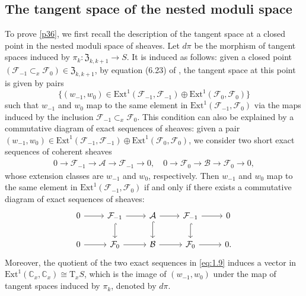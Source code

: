 \documentclass{amsart}
\numberwithin{equation}{section}
\newcommand\mc{\mathcal}
\newcommand\mf{\mathfrak}
\newcommand\mb{\mathbb}
\theoremstyle{definition}
\theoremstyle{remark}
\begin{document}
 \subsection{The tangent space of the nested moduli space}
 \label{sec:proof}
 To prove \cref{p36}, we first recall the description of the tangent space at a closed point in the nested moduli space of sheaves. Let $d\pi$ be the morphism of tangent spaces induced by $\pi_{k}:\mf{Z}_{k,k+1}\to S$. It is induced as follows: given a closed point $(\mc{F}_{-1}\subset_{x} \mc{F}_{0})\in \mf{Z}_{k,k+1}$, by equation (6.23) of \cite{neguct2018hecke}, the tangent space at this point is given by pairs 
  \begin{equation*}
    \{(w_{-1},w_{0})\in \mathrm{Ext}^1(\mc{F}_{-1},\mc{F}_{-1})\oplus \mathrm{Ext}^1(\mc{F}_{0},\mc{F}_{0})\}
  \end{equation*}
  such that $w_{-1}$ and $w_{0}$ map to the same element in $\mathrm{Ext}^1(\mc{F}_{-1},\mc{F}_{0})$ via the maps induced by the inclusion $\mc{F}_{-1}\subset_x \mc{F}_{0}$. This condition can also be explained by a commutative diagram of exact sequences of sheaves: given a pair $(w_{-1},w_0)\in \mathrm{Ext}^1(\mc{F}_{-1},\mc{F}_{-1})\oplus \mathrm{Ext}^1(\mc{F}_{0},\mc{F}_{0})$, we consider two short exact sequences of coherent sheaves
\begin{align*}
  0 \to \mc{F}_{-1} \to \mc{A} \to \mc{F}_{-1} \to 0, \quad
  0 \to \mc{F}_0 \to \mc{B} \to \mc{F}_0 \to 0,
\end{align*}
whose extension classes are $w_{-1}$ and $w_0$, respectively. Then $w_{-1}$ and $w_0$ map to the same element in $\mathrm{Ext}^1(\mc{F}_{-1},\mc{F}_{0})$ if and only if there exists a commutative diagram of exact sequences of sheaves:
\begin{equation}
  \label{eq:1.9}
  \begin{tikzcd}
    0 \ar{r} & \mc{F}_{-1} \ar{r} \ar[d,hook] & \mc{A} \ar{r} \ar[d,hook] & \mc{F}_{-1} \ar{r} \ar[d,hook] & 0 \\
    0 \ar{r} & \mc{F}_{0} \ar{r} & \mc{B} \ar{r} & \mc{F}_{0} \ar{r} & 0.
  \end{tikzcd}
\end{equation}
Moreover, the quotient of the two exact sequences in \cref{eq:1.9} induces a vector in $\mathrm{Ext}^1(\mb{C}_x,\mb{C}_x)\cong \mathrm{T}_x S$, which is the image of $(w_{-1},w_0)$ under the map of tangent spaces induced by $\pi_k$, denoted by $d\pi$. 
\end{document}
